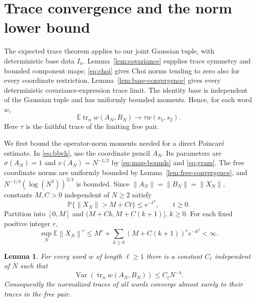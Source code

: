 \documentclass[11pt]{article}
\newtheorem{lemma}[theorem]{Lemma}
\DeclareMathOperator{\tr}{tr}
\DeclareMathOperator{\Var}{Var}
\newcommand{\E}{\mathbb E}
\newcommand{\Prob}{\mathbb P}
\newcommand{\norm}[1]{\left\|#1\right\|}
\begin{document}
\section{Trace convergence and the norm lower bound}

The expected trace theorem \cite[Lemma~3.9]{JLNP} applies to our
joint Gaussian tuple, with deterministic base data $I_n$.
Lemma~\ref{lem:covariance} supplies trace symmetry and bounded
component maps; \eqref{eq:choi} gives Choi norms tending to zero
also for every coordinate restriction.
Lemma~\ref{lem:base-convergence} gives every deterministic
covariance-expression trace limit. The identity base is independent
of the Gaussian tuple and has uniformly bounded moments.
Hence, for each word $w$,
\begin{equation}\label{eq:expected-moments}
 \E\tr_n w(A_N,B_N)\longrightarrow\tau w(s_1,s_2).
\end{equation}
Here $\tau$ is the faithful trace of the limiting free pair.

We first bound the operator-norm moments needed for a direct
Poincar\'e estimate. In \eqref{eq:bbvh}, use the coordinate pencil
$A_N$. Its parameters are $\sigma(A_N)=1$ and
$v(A_N)=N^{-1/2}$ by \eqref{eq:map-bounds} and
\eqref{eq:gram}. The free coordinate norms are uniformly bounded by
Lemma~\ref{lem:free-convergence}, and
$N^{-1/4}(\log(N^3))^{3/4}$ is bounded.
Since $\norm{A_N}=\norm{B_N}=\norm{X_N}$, constants $M,C>0$ independent
of $N\ge2$ satisfy
\begin{equation}\label{eq:coordinate-tail}
 \Prob\{\norm{X_N}>M+Ct\}\le e^{-t^2},\qquad t\ge0.
\end{equation}
Partition into $[0,M]$ and $(M+Ck,M+C(k+1)]$, $k\ge0$.
For each fixed positive integer $r$,
\[
 \sup_N\E\norm{X_N}^r
 \le M^r+\sum_{k\ge0}(M+C(k+1))^r e^{-k^2}<\infty.
\]

\begin{lemma}\label{lem:variance}
For every word $w$ of length $\ell\ge1$ there is a constant $C_\ell$
independent of $N$ such that
\[
 \Var(\tr_n w(A_N,B_N))\le C_\ell N^{-4}.
\]
Consequently the normalized traces of all words converge almost surely
to their traces in the free pair.
\end{lemma}
\end{document}
